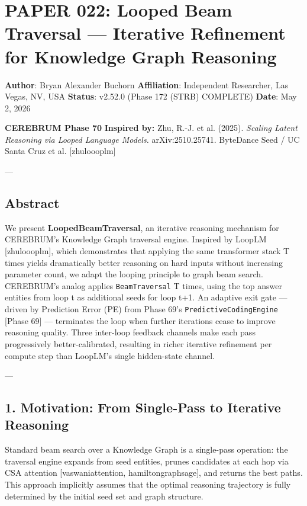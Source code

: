 \section{PAPER 022: Looped Beam Traversal — Iterative Refinement for Knowledge Graph Reasoning}

\textbf{Author}: Bryan Alexander Buchorn  
\textbf{Affiliation}: Independent Researcher, Las Vegas, NV, USA  
\textbf{Status}: v2.52.0 (Phase 172 (STRB) COMPLETE)
\textbf{Date}: May 2, 2026

\textbf{CEREBRUM Phase 70}  
\textbf{Inspired by:} Zhu, R.-J. et al. (2025). \textit{Scaling Latent Reasoning via Looped Language Models.} arXiv:2510.25741. ByteDance Seed / UC Santa Cruz et al. [zhu\-loooplm]

---

\subsection{Abstract}

We present \textbf{LoopedBeamTraversal}, an iterative reasoning mechanism for CEREBRUM's Knowledge Graph traversal engine. Inspired by LoopLM [zhu\-loooplm], which demon\-strates that applying the same transformer stack T times yields drama\-tically better reasoning on hard inputs without increasing parameter count, we adapt the looping principle to graph beam search. CEREBRUM's analog applies \texttt{BeamTraversal} T times, using the top answer entities from loop t as additional seeds for loop t+1. An adaptive exit gate — driven by Prediction Error (PE) from Phase 69's \texttt{PredictiveCodingEngine} [Phase 69] — terminates the loop when further iterations cease to improve reasoning quality. Three inter-loop feedback channels make each pass progr\-essively better-calibrated, resulting in richer iterative refinement per compute step than LoopLM's single hidden-state channel.

---

\subsection{1. Motivation: From Single-Pass to Iterative Reasoning}

Standard beam search over a Knowledge Graph is a single-pass operation: the traversal engine expands from seed entities, prunes candidates at each hop via CSA attention [vaswani\-attention, hamilton\-graphsage], and returns the best paths. This approach implicitly assumes that the optimal reasoning trajectory is fully determined by the initial seed set and graph structure.

